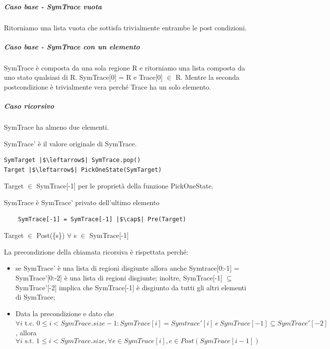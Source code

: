 \documentclass[12pt]{article}
\begin{document}
    \subparagraph*{Caso base - SymTrace vuota}
    Ritorniamo una lista vuota che sottisfa trivialmente entrambe le post condizioni.

    \subparagraph*{Caso base - SymTrace con un elemento}
    SymTrace è composta da una sola regione R e ritorniamo una lista composta da uno stato qualsiasi di R.
    SymTrace[0] = R e Trace[0] $\in$ R.
    Mentre la seconda postcondizione è trivialmente vera perché Trace ha un solo elemento.

    \subparagraph*{Caso ricorsivo}
    SymTrace ha almeno due elementi.
    
    SymTrace' è il valore originale di SymTrace.

    \begin{verbatim}
SymTarget |$\leftarrow$| SymTrace.pop()
Target |$\leftarrow$| PickOneState(SymTarget)
    \end{verbatim}

    Target $\in$ SymTrace[-1] per le proprietà della funzione PickOneState.

    SymTrace è SymTrace' privato dell'ultimo elemento
     
    \begin{verbatim}
    SymTrace[-1] = SymTrace[-1] |$\cap$| Pre(Target)
    \end{verbatim}

    Target $\in$ Post(\{s\}) $\forall$ s $\in$ SymTrace[-1]

    La precondizione della chiamata ricorsiva è rispettata perché:
    \begin{itemize}
        \item se SymTrace' è una lista di regioni disgiunte allora anche Symtrace[0:-1] = SymTrace'[0:-2] è una lista di regioni disgiunte;
        inoltre, SymTrace[-1] $\subseteq$ SymTrace'[-2] implica che SymTrace[-1] è disgiunto da tutti gli altri elementi di SymTrace;
        \item Data la precondizione e dato che $\forall i \mbox{ t.c. } 0 \leq i < SymTrace.size - 1 : SymTrace[i] = Symtrace'[i]\ e\ SymTrace[-1] \subseteq SymTrace'[-2] $, allora
        \begin{equation}
            \forall i \mbox{ s.t. } 1 \leq i < SymTrace.size, \forall e \in SymTrace[i],  e \in Post(SymTrace[i-1])
        \end{equation}
    \end{itemize}
\end{document}
